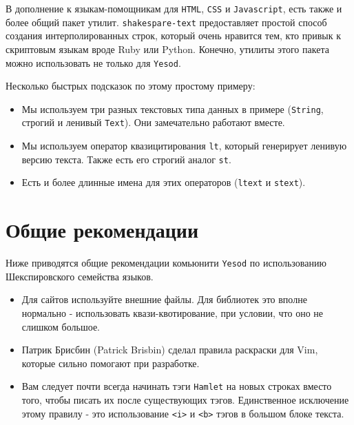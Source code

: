 В дополнение к языкам-помощникам для \texttt{HTML}, \texttt{CSS} и \texttt{Javascript}, есть также и более
общий пакет утилит. \lstinline!shakespare-text! предоставляет простой способ
создания интерполированных строк, который очень нравится тем, кто привык к
скриптовым языкам вроде Ruby или Python. Конечно, утилиты этого пакета можно
использовать не только для \texttt{Yesod}.

Несколько быстрых подсказок по этому простому примеру:
\begin{itemize}
\item Мы используем три разных текстовых типа данных в примере
(\lstinline!String!, строгий и ленивый \lstinline!Text!). Они замечательно
работают вместе.
\item Мы используем оператор квазицитирования \lstinline!lt!, который генерирует
ленивую версию текста. Также есть его строгий аналог \lstinline!st!.
\item Есть и более длинные имена для этих операторов
(\lstinline!ltext! и \lstinline!stext!).
\end{itemize}

\section{Общие рекомендации}

Ниже приводятся общие рекомендации комьюнити \texttt{Yesod} по использованию
Шекспировского семейства языков.

\begin{itemize}
\item Для сайтов используйте внешние файлы. Для библиотек это вполне
нормально - использовать квази-квотирование, при условии, что оно не слишком большое.
\item Патрик Брисбин (Patrick Brisbin) сделал правила раскраски для Vim,
которые сильно помогают при разработке.
\item Вам следует почти всегда начинать тэги \texttt{Hamlet} на новых строках вместо того,
чтобы писать их после существующих тэгов. Единственное исключение этому правилу - это
использование \lstinline!<i>! и \lstinline!<b>! тэгов в большом блоке текста.
\end{itemize}
